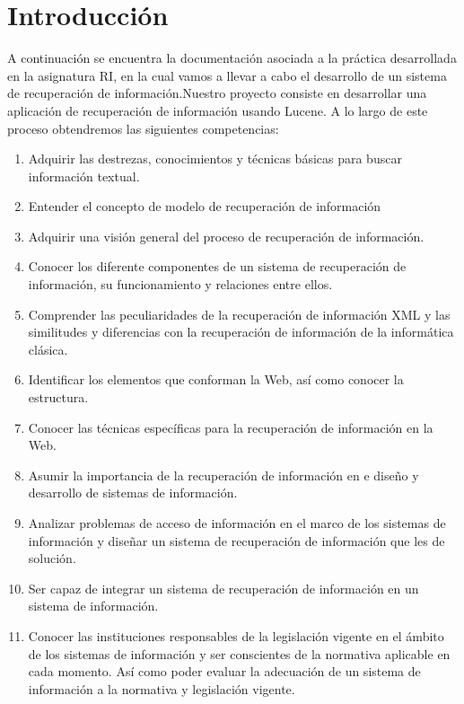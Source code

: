 \section{Introducción}
A continuación se encuentra la documentación asociada a la práctica desarrollada en la asignatura RI, en la cual vamos a llevar a cabo el desarrollo de un sistema de recuperación de información.Nuestro proyecto consiste en desarrollar una aplicación de recuperación de información usando Lucene. A lo largo de este proceso obtendremos las siguientes competencias:
\begin{enumerate}

  \item Adquirir las destrezas, conocimientos y técnicas básicas para buscar información textual.
  \item Entender el concepto de modelo de recuperación de información
  \item Adquirir una visión general del proceso de recuperación de información. 
  \item Conocer los diferente componentes de un sistema de recuperación de información, su funcionamiento y relaciones entre ellos. 
  \item Comprender las peculiaridades de la recuperación de información XML y las similitudes y diferencias con la recuperación de información de la informática clásica.
  \item Identificar los elementos que conforman la Web, así como conocer la estructura.
  \item Conocer las técnicas específicas para la recuperación de información en la Web.
  \item Asumir la importancia de la recuperación de información en e diseño y desarrollo de sistemas de información.
  \item Analizar problemas de acceso de información en el marco de los sistemas de información y diseñar un sistema de recuperación de información que les de solución.
  \item Ser capaz de integrar un sistema de recuperación de información en un sistema de información.
  \item Conocer las instituciones responsables de la legislación vigente en el ámbito de los sistemas de información y ser conscientes de la normativa aplicable en cada momento. Así como poder evaluar la adecuación de un sistema de información a la normativa y legislación vigente. 

\end{enumerate}

